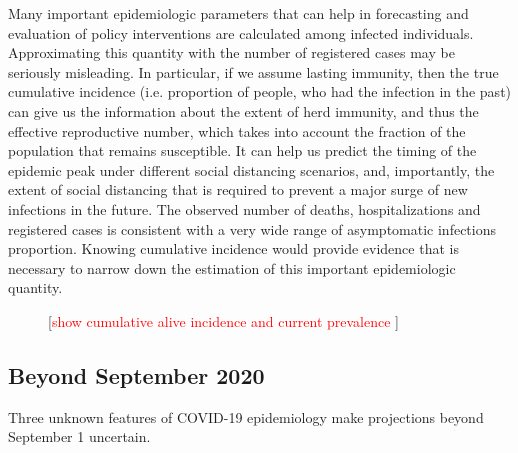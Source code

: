 \documentclass[11pt]{article}
\newcommand{\comment}[1]{[\textcolor{red}{#1}]}
\begin{document}
Many important epidemiologic parameters that can help in forecasting and evaluation of policy interventions are calculated among infected individuals. Approximating this quantity with the number of registered cases may be seriously misleading. In particular, if we assume lasting immunity, then the true cumulative incidence (i.e. proportion of people, who had the infection in the past) can give us the information about the extent of herd immunity, and thus the effective reproductive number, which takes into account the fraction of the population that remains susceptible. It can help us predict the timing of the epidemic peak under different social distancing scenarios, and, importantly, the extent of social distancing that is required to prevent a major surge of new infections in the future. The observed number of deaths, hospitalizations and registered cases is consistent with a very wide range of asymptomatic infections proportion. Knowing cumulative incidence would provide evidence that is necessary to narrow down the estimation of this important epidemiologic quantity. 



\begin{figure}
\centering
\caption{\comment{show cumulative alive incidence and current prevalence }}
\label{fig:cumincidence}
\end{figure}





\subsection*{Beyond September 2020}

Three unknown features of COVID-19 epidemiology make projections beyond September 1 uncertain. 
\end{document}
